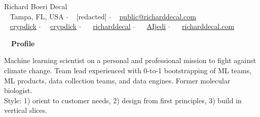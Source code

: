 \documentclass[a4paper,12pt]{article}
\newcommand{\resheading}[1]{{\hspace{-9pt} \colorbox{mygrey}{\begin{minipage}{\textwidth}{\textmd{~~\large \textbf{#1} \vphantom{p\^{E}}}}\end{minipage}}\vspace{6pt}} }
\begin{document}
    \begin{center}
    {\Huge Richard Boeri Decal}
        \\
        {\small \faMapMarker~ Tampa, FL, USA $\cdot$ \faPhone~ [redacted] $\cdot$ \faEnvelope~ \href{mailto:public@richarddecal.com}{public@richarddecal.com}  \\ \faGithubAlt~ \href{https://github.com/crypdick}{crypdick} $\cdot$~\faStackOverflow~  \href{https://stackoverflow.com/users/4212158/crypdick}{crypdick} $\cdot$ ~\faLinkedin~ \href{https://www.linkedin.com/in/richarddecal/}{richarddecal}  $\cdot$ ~\faTwitter~ \href{https://twitter.com/AIjedi}{AIjedi}  $\cdot$ ~\faHome~  \href{https://www.richarddecal.com}{richarddecal.com}}
    \end{center}

    \resheading{Profile}

    Machine learning scientist on a personal and professional mission to fight against climate change.
    Team lead experienced with 0-to-1 bootstrapping of ML teams, ML products, data collection teams, and data engines.
    Former molecular biologist.\\

    Style: 1) orient to customer needs, 2) design from first principles, 3) build in vertical slices.\\


%
\end{document}
